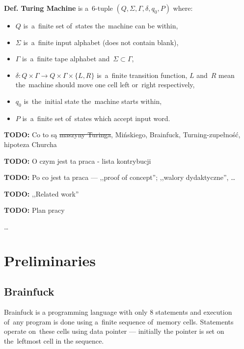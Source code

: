 \documentclass[english,shortabstract,mgr]{iithesis}
\newcommand{\todo}[1]{\textbf{TODO:} #1}
\begin{document}
\textbf{Def. Turing Machine} is a~$6$-tuple $(Q,\Sigma,\Gamma,\delta,q_0,P)$ where:
\begin{itemize}
  \item $Q$ is~a~finite set of~states the~machine can be within,
  \item $\Sigma$ is~a~finite input alphabet (does not contain blank),
  \item $\Gamma$ is~a~finite tape alphabet and~$\Sigma \subset \Gamma$,
  \item $\delta: Q \times \Gamma \rightarrow Q \times \Gamma \times \{L,R\}$ is~a~finite
      transition function, $L$ and~$R$ mean the~machine should move one cell left or~right
      respectively,
  \item $q_0$ is~the~initial state the~machine starts within,
  \item $P$ is~a~finite set of~states which accept input word.
\end{itemize}


\todo{Co to są \sout{maszyny Turinga}, Mińskiego, Brainfuck, Turning-zupełność, hipoteza Churcha}

\todo{O czym jest ta praca - lista kontrybucji}

\todo{Po co jest ta praca --- ,,proof of concept''; ,,walory dydaktyczne'', \dots}

\todo{,,Related work''}

\todo{Plan pracy}

\ldots

\chapter {Preliminaries}

\section {Brainfuck}

Brainfuck is a programming language with only $8$ statements and execution
of~any program is done using a~finite sequence of~memory cells. Statements
operate on~these cells using data pointer --- initially the pointer is set
on the~leftmost cell in the sequence.
\end{document}
